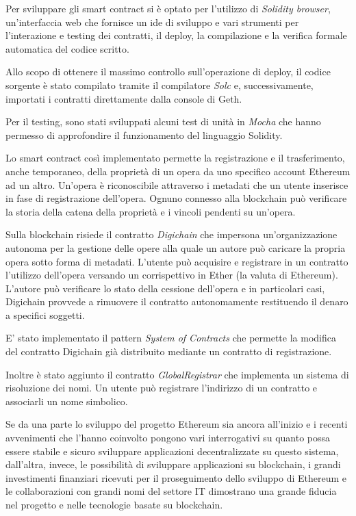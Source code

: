 \documentclass[11pt,oneside,a4paper]{article}
\begin{document}
	Per sviluppare gli smart contract si è optato per l'utilizzo di \textit{Solidity browser}, un'interfaccia web che fornisce un ide di sviluppo e vari strumenti per l'interazione e testing dei contratti, il deploy, la compilazione e la verifica formale automatica del codice scritto.
	
	Allo scopo di ottenere il massimo controllo sull'operazione di deploy, il codice sorgente è stato compilato tramite il compilatore \textit{Solc} e, successivamente, importati i contratti direttamente dalla console di Geth.
	
	Per il testing, sono stati sviluppati alcuni test di unità in \textit{Mocha} che hanno permesso di approfondire il funzionamento del linguaggio Solidity.
	
	
	Lo smart contract così implementato permette la registrazione e il trasferimento, anche temporaneo, della proprietà di un opera da uno specifico account Ethereum ad un altro. Un'opera è riconoscibile attraverso i metadati che un utente inserisce in fase di registrazione dell'opera. Ognuno connesso alla blockchain può verificare la storia della catena della proprietà e i vincoli pendenti su un'opera.
	
	Sulla blockchain risiede il contratto \textit{Digichain} che impersona un'organizzazione autonoma per la gestione delle opere alla quale un autore può caricare la propria opera sotto forma di metadati.
	L'utente può acquisire e registrare in un contratto l'utilizzo dell'opera versando un corrispettivo in Ether (la valuta di Ethereum). L'autore può verificare lo stato della cessione dell'opera e in particolari casi, Digichain provvede a rimuovere il contratto autonomamente restituendo il denaro a specifici soggetti.
	
	E' stato implementato il pattern \textit{System of Contracts} che permette la modifica del contratto Digichain già distribuito mediante un contratto di registrazione.
	
	Inoltre è stato aggiunto il contratto \textit{GlobalRegistrar} che implementa un sistema di risoluzione dei nomi. Un utente può registrare l'indirizzo di un contratto e associarli un nome simbolico.
	
	Se da una parte lo sviluppo del progetto Ethereum sia ancora all'inizio e i recenti avvenimenti che l'hanno coinvolto pongono vari interrogativi su quanto possa essere stabile e sicuro sviluppare applicazioni decentralizzate su questo sistema, dall'altra, invece, le possibilità di sviluppare applicazioni su blockchain, i grandi investimenti finanziari ricevuti per il proseguimento dello sviluppo di Ethereum e le collaborazioni con grandi nomi del settore IT dimostrano una grande fiducia nel progetto e nelle tecnologie basate su blockchain.
	
\end{document}
